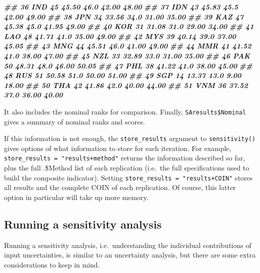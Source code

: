 \documentclass[
]{book}
\newenvironment{Shaded}{\begin{snugshade}}{\end{snugshade}}
\newcommand{\DocumentationTok}[1]{\textcolor[rgb]{0.56,0.35,0.01}{\textbf{\textit{#1}}}}
\begin{document}
\begin{Shaded}
\begin{Highlighting}[]
\DocumentationTok{\#\# 36      IND      45 45.50   46.0 42.00 48.00}
\DocumentationTok{\#\# 37      IDN      43 45.83   45.5 42.00 49.00}
\DocumentationTok{\#\# 38      JPN      34 33.56   34.0 31.00 35.00}
\DocumentationTok{\#\# 39      KAZ      47 45.38   45.0 41.95 49.00}
\DocumentationTok{\#\# 40      KOR      31 31.08   31.0 29.00 34.00}
\DocumentationTok{\#\# 41      LAO      48 41.71   41.0 35.00 49.00}
\DocumentationTok{\#\# 42      MYS      39 40.14   39.0 37.00 45.05}
\DocumentationTok{\#\# 43      MNG      44 45.51   46.0 41.00 49.00}
\DocumentationTok{\#\# 44      MMR      41 41.52   41.0 38.00 47.00}
\DocumentationTok{\#\# 45      NZL      33 32.89   33.0 31.00 35.00}
\DocumentationTok{\#\# 46      PAK      50 48.31   48.0 46.00 50.05}
\DocumentationTok{\#\# 47      PHL      38 41.22   41.0 38.00 45.00}
\DocumentationTok{\#\# 48      RUS      51 50.58   51.0 50.00 51.00}
\DocumentationTok{\#\# 49      SGP      14 13.37   13.0  9.00 18.00}
\DocumentationTok{\#\# 50      THA      42 41.86   42.0 40.00 44.00}
\DocumentationTok{\#\# 51      VNM      36 37.52   37.0 36.00 40.00}
\end{Highlighting}
\end{Shaded}

It also includes the nominal ranks for comparison. Finally, \texttt{SAresults\$Nominal} gives a summary of nominal ranks and scores.

If this information is not enough, the \texttt{store\_results} argument to \texttt{sensitivity()} gives options of what information to store for each iteration. For example, \texttt{store\_results\ =\ "results+method"} returns the information described so far, plus the full .\$Method list of each replication (i.e.~the full specifications used to build the composite indicator). Setting \texttt{store\_results\ =\ "results+COIN"} stores all results and the complete COIN of each replication. Of course, this latter option in particular will take up more memory.

\hypertarget{running-a-sensitivity-analysis}{%
\subsection{Running a sensitivity analysis}\label{running-a-sensitivity-analysis}}

Running a sensitivity analysis, i.e.~understanding the individual contributions of input uncertainties, is similar to an uncertainty analysis, but there are some extra considerations to keep in mind.
\end{document}
